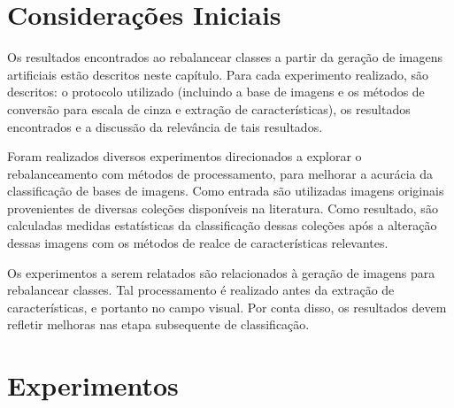 

\section{Considerações Iniciais}

Os resultados encontrados ao rebalancear classes a partir da geração de imagens artificiais estão descritos neste capítulo. Para cada experimento realizado, são descritos: o protocolo utilizado (incluindo a base de imagens e os métodos de conversão para escala de cinza e extração de características), os resultados encontrados e a discussão da relevância de tais resultados.

Foram realizados diversos experimentos direcionados a explorar o rebalanceamento com métodos de processamento, para melhorar a acurácia da classificação de bases de imagens. Como entrada são utilizadas imagens originais provenientes de diversas coleções disponíveis na literatura. Como resultado, são calculadas medidas estatísticas da classificação dessas coleções após a alteração dessas imagens com os métodos de realce de características relevantes.

Os experimentos a serem relatados são relacionados à geração de imagens para rebalancear classes. Tal processamento é realizado antes da extração de características, e portanto no campo visual. Por conta disso, os resultados devem refletir melhoras nas etapa subsequente de classificação.


\section{Experimentos}

